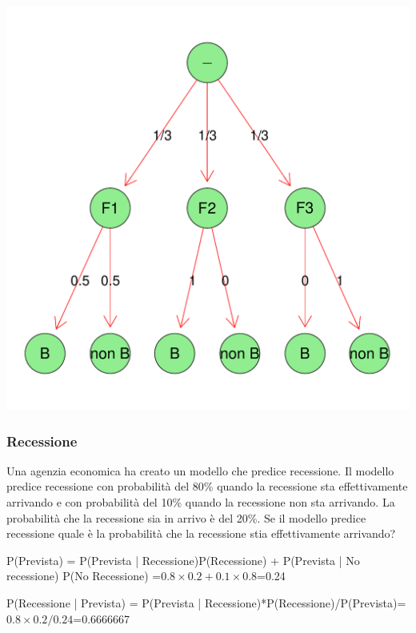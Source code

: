 \documentclass[onecolumn,12pt]{book}\usepackage[]{graphicx}\usepackage[]{color}
\makeatletter
\def\maxwidth{ %
  \ifdim\Gin@nat@width>\linewidth
    \linewidth
  \else
    \Gin@nat@width
  \fi
}
\newenvironment{knitrout}{}{} %
\makeatother
\begin{document}
\begin{knitrout}
\color{fgcolor}
\includegraphics[width=\maxwidth]{figure/unnamed-chunk-29-1} 

\end{knitrout}


\subsubsection{Recessione}

Una agenzia economica ha creato un modello che predice recessione. Il modello predice recessione con probabilità del 80\% quando  la recessione sta effettivamente arrivando e con probabilità del 10\% quando la recessione non sta arrivando. La probabilità che la recessione sia in arrivo è del 20\%. Se il modello predice recessione quale è la probabilità che la recessione stia effettivamente arrivando?

P(Prevista) = P(Prevista | Recessione)P(Recessione) + P(Prevista | No recessione) P(No Recessione) =$0.8\times 0.2 + 0.1\times 0.8$=0.24



P(Recessione | Prevista) = P(Prevista | Recessione)*P(Recessione)/P(Prevista)=$0.8\times 0.2/0.24$=0.6666667
\end{document}
